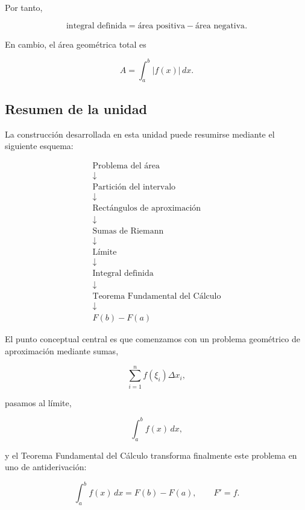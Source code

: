 \documentclass[12pt]{article}
\begin{document}
Por tanto,

\[
\boxed{
\text{integral definida}
=
\text{área positiva}
-
\text{área negativa}.
}
\]

En cambio, el área geométrica total es

\[
\boxed{
A
=
\int_a^b |f(x)|\,dx.
}
\]

\subsection{Resumen de la unidad}

La construcción desarrollada en esta unidad puede resumirse mediante el
siguiente esquema:

\[
\boxed{
\begin{array}{c}
\text{Problema del área}
\\[0.3cm]
\downarrow
\\[0.3cm]
\text{Partición del intervalo}
\\[0.3cm]
\downarrow
\\[0.3cm]
\text{Rectángulos de aproximación}
\\[0.3cm]
\downarrow
\\[0.3cm]
\text{Sumas de Riemann}
\\[0.3cm]
\downarrow
\\[0.3cm]
\text{Límite}
\\[0.3cm]
\downarrow
\\[0.3cm]
\text{Integral definida}
\\[0.3cm]
\downarrow
\\[0.3cm]
\text{Teorema Fundamental del Cálculo}
\\[0.3cm]
\downarrow
\\[0.3cm]
F(b)-F(a)
\end{array}
}
\]

El punto conceptual central es que comenzamos con un problema geométrico
de aproximación mediante sumas,

\[
\sum_{i=1}^{n}f(\xi_i)\Delta x_i,
\]

pasamos al límite,

\[
\int_a^b f(x)\,dx,
\]

y el Teorema Fundamental del Cálculo transforma finalmente este problema
en uno de antiderivación:

\[
\boxed{
\int_a^b f(x)\,dx=F(b)-F(a),
\qquad F'=f.
}
\]
\end{document}
